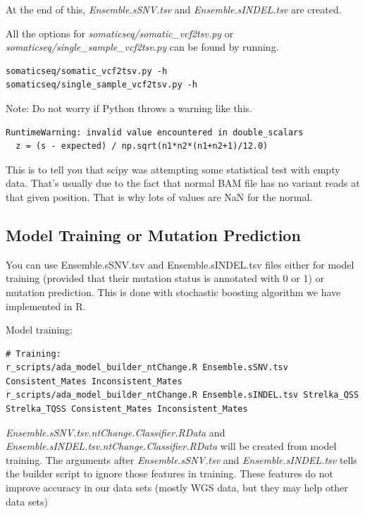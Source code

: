 \documentclass[10pt,letterpaper]{article}
\begin{document}
\begin{sloppypar}
At the end of this, \textit{Ensemble.sSNV.tsv} and \textit{Ensemble.sINDEL.tsv} are created. 

All the options for \textit{somaticseq/somatic\_vcf2tsv.py} or \textit{somaticseq/single\_sample\_vcf2tsv.py} can be found by running. 

\begin{lstlisting}
somaticseq/somatic_vcf2tsv.py -h
somaticseq/single_sample_vcf2tsv.py -h
\end{lstlisting}


Note: Do not worry if Python throws a warning like this. 

\begin{lstlisting}
RuntimeWarning: invalid value encountered in double_scalars
  z = (s - expected) / np.sqrt(n1*n2*(n1+n2+1)/12.0)
\end{lstlisting}

This is to tell you that scipy was attempting some statistical test with empty data. That's usually due to the fact that normal BAM file has no variant reads at that given position. That is why lots of values are NaN for the normal. 




\subsection{Model Training or Mutation Prediction}

You can use Ensemble.sSNV.tsv and Ensemble.sINDEL.tsv files either for model training (provided that their mutation status is annotated with 0 or 1) or mutation prediction. This is done with stochastic boosting algorithm we have implemented in R. 
	
Model training:
\begin{lstlisting}
# Training:
r_scripts/ada_model_builder_ntChange.R Ensemble.sSNV.tsv   Consistent_Mates Inconsistent_Mates
r_scripts/ada_model_builder_ntChange.R Ensemble.sINDEL.tsv Strelka_QSS Strelka_TQSS Consistent_Mates Inconsistent_Mates
\end{lstlisting}
	
\textit{Ensemble.sSNV.tsv.ntChange.Classifier.RData} and \textit{Ensemble.sINDEL.tsv.ntChange.Classifier.RData} will be created from model training. The arguments after \textit{Ensemble.sSNV.tsv} and \textit{Ensemble.sINDEL.tsv} tells the builder script to ignore those features in training. These features do not improve accuracy in our data sets (mostly WGS data, but they may help other data sets)
	


\end{sloppypar}
\end{document}
